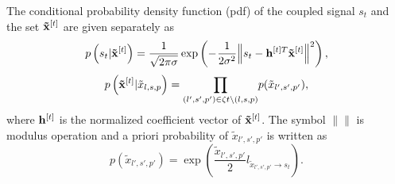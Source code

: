 \documentclass[conference]{IEEEtran}
\begin{document}
The conditional probability density function (pdf) of the coupled signal ${{s_t}}$ and the set ${{\bf{\tilde x}}^{[t]}}$ are given separately as
\begin{equation}
p\left( {{s_t}|{{\bf{\tilde x}}^{[t]}}} \right) = \frac{1}{{\sqrt {2\pi \sigma } }}\exp \left( { - {\mkern 1mu} \frac{1}{{2{\sigma ^2}}}{{\left\| {{s_t} - {{\bf{h}}^{[t]T}}{{\bf{\tilde x}}^{[t]}}} \right\|}^2}} \right)\label{12},
\end{equation}
\begin{equation}
\begin{aligned}
p\left( {{{\bf{\tilde x}}^{[t]}}|{{\tilde {x}}_{l,s,p}}} \right) = {\prod _{(l',s',p') \in \zeta t\backslash (l,s,p)}}p({\tilde {x}_{l',s',p'}})\label{13},
\end{aligned}
\end{equation}
where ${{\bf{h}}^{[t]}}$ is the normalized coefficient vector of ${{\bf{\tilde x}}^{[t]}}$. The symbol $\left\| {} \right\|$ is modulus operation and a priori probability of ${\tilde {x}_{l',s',p'}}$ is written as
\begin{equation}
p({\tilde {x}_{l',s',p'}}) = \exp \left( {\frac{{{{\tilde {x}}_{l',s',p'}}}}{2}{l_{{{\tilde {x}}_{l',s',p'}} \to {s_t}}}} \right)\label{14}.
\end{equation}
\end{document}
